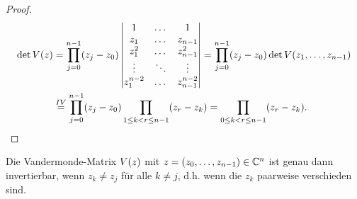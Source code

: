 \begin{proof}
\[\begin{split}
            \det{V \! \left( z \right)}
            &= \prod_{j=0}^{n-1} (z_j - z_0) \begin{vmatrix}
                1         & \dots & 1 \\
                z_1       & \dots & z_{n-1} \\
                z_1^2     & \dots & z_{n-1}^2 \\
                \vdots    & \ddots & \vdots \\
                z_1^{n-2} & \dots & z_{n-1}^{n-2}
            \end{vmatrix}
            = \prod_{j=0}^{n-1} (z_j - z_0) \det{V \! \left( z_1, \dots, z_{n-1} \right)}\\
            &\overset{IV}{=} \prod_{j=0}^{n-1} (z_j - z_0) \prod_{1 \leq k < r \leq n-1} (z_r - z_k)
            = \prod_{0 \leq k < r \leq n-1} (z_r - z_k).
        \end{split}
    \]
\end{proof}

\begin{corollary}
    Die Vandermonde-Matrix $V \! \left( z \right)$ mit
    $z = (z_0, \dots, z_{n-1}) \in \mathbb{C}^n$ ist genau dann invertierbar, wenn
    $z_k \neq z_j$ für alle $k \neq j$, d.h. wenn die $z_k$ paarweise
    verschieden sind.
\end{corollary}

